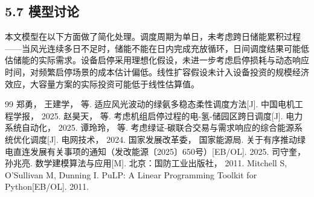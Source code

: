 \documentclass[zihao=-4,a4paper]{ctexart} %
\begin{document}
	\subsection*{5.7 模型讨论}
	
	本文模型在以下方面做了简化处理。调度周期为单日，未考虑跨日储能累积过程——当风光连续多日不足时，储能不能在日内完成充放循环，日间调度结果可能低估储能的实际需求。设备启停采用理想化假设，未进一步考虑启停损耗与动态响应时间，对频繁启停场景的成本估计偏低。线性扩容假设未计入设备投资的规模经济效应，大容量方案的实际投资可能低于线性估算值。
	
	
	\begin{thebibliography}{99}
		 郑勇， 王建学， 等. 适应风光波动的绿氨多稳态柔性调度方法[J]. 中国电机工程学报， 2025.
		 赵昊天， 等. 考虑机组启停过程的电-氢-储园区跨日调度[J]. 电力系统自动化， 2025.
		 谭玲玲， 等. 考虑绿证-碳联合交易与需求响应的综合能源系统优化调度[J]. 电网技术， 2024.
		 国家发展改革委， 国家能源局. 关于有序推动绿电直连发展有关事项的通知（发改能源〔2025〕650号）[EB/OL]. 2025.
		 司守奎， 孙兆亮. 数学建模算法与应用[M]. 北京：国防工业出版社， 2011.
		 Mitchell S, O'Sullivan M, Dunning I. PuLP: A Linear Programming Toolkit for Python[EB/OL]. 2011.
	\end{thebibliography}
	
\end{document}
